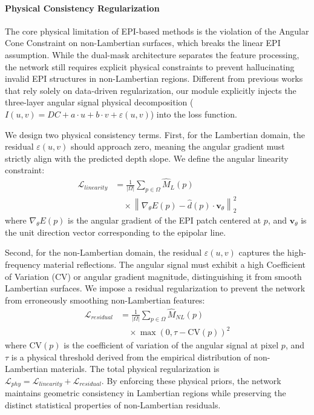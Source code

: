 \documentclass[lettersize,journal]{IEEEtran}
\begin{document}
\paragraph{Physical Consistency Regularization}
The core physical limitation of EPI-based methods is the violation of the Angular Cone Constraint on non-Lambertian surfaces, which breaks the linear EPI assumption. While the dual-mask architecture separates the feature processing, the network still requires explicit physical constraints to prevent hallucinating invalid EPI structures in non-Lambertian regions. Different from previous works that rely solely on data-driven regularization, our module explicitly injects the three-layer angular signal physical decomposition ($I(u,v) = DC + a \cdot u + b \cdot v + \varepsilon(u,v)$) into the loss function.

We design two physical consistency terms. First, for the Lambertian domain, the residual $\varepsilon(u,v)$ should approach zero, meaning the angular gradient must strictly align with the predicted depth slope. We define the angular linearity constraint:
\begin{equation}
\begin{aligned}
\mathcal{L}_{linearity} &= \frac{1}{|\Omega|} \sum_{p \in \Omega} \hat{M}_L(p) \\
&\quad \times \left\| \nabla_{\theta} E(p) - \hat{d}(p) \cdot \mathbf{v}_{\theta} \right\|_2^2
\end{aligned}
\end{equation}
where $\nabla_{\theta} E(p)$ is the angular gradient of the EPI patch centered at $p$, and $\mathbf{v}_{\theta}$ is the unit direction vector corresponding to the epipolar line. 

Second, for the non-Lambertian domain, the residual $\varepsilon(u,v)$ captures the high-frequency material reflections. The angular signal must exhibit a high Coefficient of Variation (CV) or angular gradient magnitude, distinguishing it from smooth Lambertian surfaces. We impose a residual regularization to prevent the network from erroneously smoothing non-Lambertian features:
\begin{equation}
\begin{aligned}
\mathcal{L}_{residual} &= \frac{1}{|\Omega|} \sum_{p \in \Omega} \hat{M}_{NL}(p) \\
&\quad \times \max(0, \tau - \text{CV}(p))^2
\end{aligned}
\end{equation}
where $\text{CV}(p)$ is the coefficient of variation of the angular signal at pixel $p$, and $\tau$ is a physical threshold derived from the empirical distribution of non-Lambertian materials. The total physical regularization is $\mathcal{L}_{phy} = \mathcal{L}_{linearity} + \mathcal{L}_{residual}$. By enforcing these physical priors, the network maintains geometric consistency in Lambertian regions while preserving the distinct statistical properties of non-Lambertian residuals.
\end{document}
